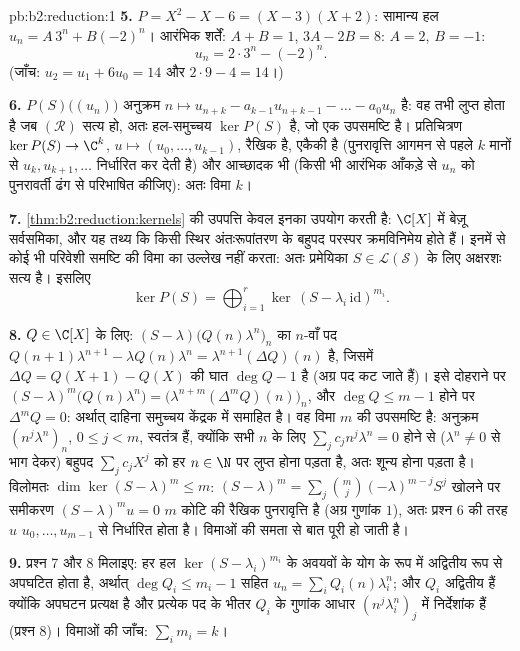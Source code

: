 \begin{solution}{pb:b2:reduction:1}
\textbf{5.} $P = X^2 - X - 6 = (X - 3)(X + 2)$: सामान्य हल $u_n = A\,3^n + B(-2)^n$। आरंभिक शर्तें: $A + B = 1$, $3A -
2B = 8$: $A = 2$, $B = -1$:
\[
u_n = 2\cdot 3^n - (-2)^n .
\]
(जाँच: $u_2 = u_1 + 6u_0 = 14$ और $2\cdot9 - 4 = 14$।)

\textbf{6.} $P(S)\bigl((u_n)\bigr)$ अनुक्रम $n \mapsto
u_{n+k} - a_{k-1}u_{n+k-1} - \dots - a_0u_n$ है: वह तभी लुप्त होता है जब $(\mathcal R)$ सत्य हो,
अतः हल-समुच्चय $\ker P(S)$ है, जो एक उपसमष्टि है। प्रतिचित्रण $\ker P(S) \to \C^k$, $u \mapsto (u_0, \dots,
u_{k-1})$,
रैखिक है, एकैकी है (पुनरावृत्ति आगमन से पहले $k$ मानों से $u_{k}, u_{k+1}, \dots$ निर्धारित
कर देती है) और आच्छादक भी (किसी भी आरंभिक आँकड़े से $u_n$ को पुनरावर्ती
ढंग से परिभाषित कीजिए): अतः विमा $k$।

\textbf{7.} \cref{thm:b2:reduction:kernels} की उपपत्ति केवल इनका उपयोग करती है: $\C[X]$ में बेज़ू
सर्वसमिका, और यह तथ्य कि किसी स्थिर अंतःरूपांतरण के बहुपद परस्पर
क्रमविनिमेय होते हैं। इनमें से कोई भी परिवेशी समष्टि की विमा का उल्लेख
नहीं करता: अतः प्रमेयिका $S \in \mathcal{L}(\mathcal{S})$ के लिए अक्षरशः सत्य है। इसलिए
\[
\ker P(S) = \bigoplus_{i=1}^{r}
\ker\,(S - \lambda_i\,\mathrm{id})^{m_i}.
\]

\textbf{8.} $Q \in \C[X]$ के लिए: $(S -
\lambda)\bigl(Q(n)\lambda^n\bigr)_n$ का $n$-वाँ पद $Q(n{+}1)\lambda^{n+1} - \lambda Q(n)\lambda^n =
\lambda^{n+1}(\Delta Q)(n)$ है, जिसमें $\Delta Q = Q(X{+}1) - Q(X)$ की घात
$\deg Q - 1$ है (अग्र पद कट जाते हैं)। इसे दोहराने पर $(S - \lambda)^m\bigl(Q(n)\lambda^n\bigr) =
\bigl(\lambda^{n+m}(\Delta^m Q)(n)\bigr)_n$, और $\deg Q \leq m - 1$ होने पर $\Delta^m Q = 0$:
अर्थात् दाहिना समुच्चय केंद्रक में समाहित है। वह विमा $m$ की उपसमष्टि
है: अनुक्रम $(n^j\lambda^n)_n$, $0 \leq j < m$, स्वतंत्र हैं, क्योंकि सभी $n$ के लिए $\sum_j c_j n^j\lambda^n = 0$
होने से ($\lambda^n \neq 0$ से भाग देकर) बहुपद $\sum_j c_jX^j$ को हर $n \in \N$ पर लुप्त होना पड़ता
है, अतः शून्य होना पड़ता है। विलोमतः $\dim\ker(S -
\lambda)^m \leq m$: $(S - \lambda)^m = \sum_j
\binom mj(-\lambda)^{m-j}S^j$ खोलने पर समीकरण $(S - \lambda)^m u =
0$
$m$ कोटि की रैखिक पुनरावृत्ति है (अग्र गुणांक $1$), अतः प्रश्न 6 की
तरह $u$ $u_0, \dots, u_{m-1}$ से निर्धारित होता है। विमाओं की समता से बात पूरी हो जाती
है।

\textbf{9.} प्रश्न 7 और 8 मिलाइए: हर हल $\ker(S -
\lambda_i)^{m_i}$ के अवयवों के योग के रूप
में अद्वितीय रूप से अपघटित होता है, अर्थात् $\deg Q_i \leq m_i - 1$ सहित $u_n = \sum_i Q_i(n)\lambda_i^n$; और $Q_i$
अद्वितीय हैं क्योंकि अपघटन प्रत्यक्ष है और प्रत्येक पद के भीतर $Q_i$ के
गुणांक आधार $(n^j\lambda_i^n)_j$ में निर्देशांक हैं (प्रश्न 8)। विमाओं की जाँच: $\sum_i m_i = k$।


\end{solution}
